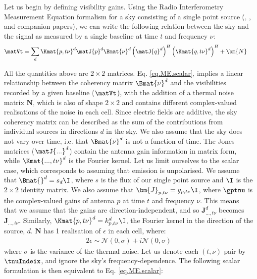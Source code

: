 \pg
Let us begin by defining visibility gains. Using the Radio Interferometry Measurement Equation formalism for a sky consisting of a single point source (\cite{1996A&AS..117..137H}, \cite{2011A&A...527A.106S}, and companion papers), we can write the following relation between the sky and the signal as measured by a single baseline at time $t$ and frequency $\nu$:
\begin{align}\label{eq.ME.scalar}
\matVt &= \sum_d \Kmat{p,t\nu}^d \matJ{p}^d \Bmat{\nu}^d \left(\matJ{q}^d\right)^H \left(\Kmat{q,t\nu}^d\right)^H + \bm{N} 
\end{align}

\pg
All the quantities above are $2\times2$ matrices. Eq. \ref{eq.ME.scalar}, implies a linear relationship between the coherency matrix $\Bmat{\nu}^d$ and the visibilities recorded by a given baseline ($\matVt$), with the addition of a thermal noise matrix $\bm{N}$, which is also of shape $2 \times 2$ and contains different complex-valued realisations of the noise in each cell. Since electric fields are additive, the sky coherency matrix can be described as the sum of the contributions from individual sources in directions $d$ in the sky. We also assume that the sky does not vary over time, i.e. that $\Bmat{\nu}^d$ is not a function of time. The Jones matrices ($\matJ{...}^d$) contain the antenna gain information in matrix form, while $\Kmat{...,t\nu}^d$ is the Fourier kernel.  
Let us limit ourselves to the scalar case, which corresponds to assuming that emission is unpolarised. We assume that $\Bmat{}^d = s_d \I$, where $s$ is the flux of our single point source and $\I$ is the $2\times 2$ identity matrix. We also assume that $\bm{J}_{p,t\nu} = g_{p,t\nu} \I$, where $\gptnu$ is the complex-valued gains of antenna $p$ at time $t$ and frequency $\nu$. This means that we assume that the gains are direction-independent, and so $\bm{J}_{...,t\nu}^d$ becomes $\bm{J}_{...,t\nu}$. Similarly, $\Kmat{p,t\nu}^d = k_{p,t\nu}^d \I$, the Fourier kernel in the direction of the source, $d$. $\bm{N}$ has 1 realisation of $\epsilon$ in each cell, where:
\begin{alignat}{2}
\epsilon \sim \mathcal{N}\left(0,\sigma\right) + i \mathcal{N}\left(0,\sigma\right) \label{eq.noise.distribution}
\end{alignat}
where $\sigma$ is the variance of the thermal noise. Let us denote each $\left(t,\nu\right)$ pair by $\tnuIndeix$, and ignore the sky's frequency-dependence. The following scalar formulation is then equivalent to Eq. \ref{eq.ME.scalar}:

